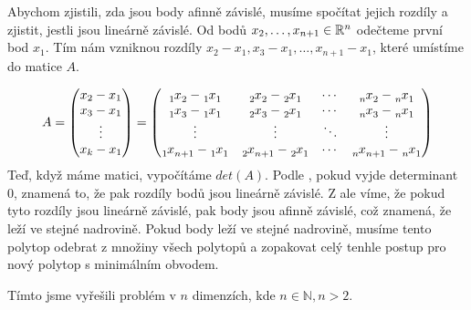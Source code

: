 Abychom zjistili, zda jsou body afinně závislé, musíme spočítat jejich rozdíly a zjistit, jestli jsou lineárně závislé. Od bodů $x_2, \ldots, x_{n+1} \in \mathbb{R}^n$ odečteme první bod $x_1$. Tím nám vzniknou rozdíly $x_2-x_1, x_3-x_1, \dots, x_{n+1}-x_1$, které umístíme do matice $A$. 


\begingroup
\renewcommand*{\arraystretch}{1.25}
\delimitershortfall=0pt
\begin{equation*}
  A =
  \begin{pmatrix}
    x_2-x_1 \\
    x_3-x_1 \\
    \vdots  \\
    x_k-x_1
  \end{pmatrix}
  =
  \begin{pmatrix}
    \x{1}{2} - \x{1}{1} & \x{2}{2} - \x{2}{1} & \cdots & \x{n}{2} - \x{n}{1} \\
    \x{1}{3} - \x{1}{1} & \x{2}{3} - \x{2}{1} & \cdots & \x{n}{3} - \x{n}{1} \\
    \vdots        & \vdots        & \ddots & \vdots        \\
    \x{1}{n_+_1} - \x{1}{1} & \x{2}{n_+_1} - \x{2}{1} & \cdots & \x{n}{n_+_1} - \x{n}{1} \\
  \end{pmatrix}
\end{equation*}
\endgroup
Teď, když máme matici, vypočítáme $det(A)$. Podle , pokud vyjde determinant $0$, znamená to, že pak rozdíly bodů jsou lineárně závislé. Z  ale víme, že pokud tyto rozdíly jsou lineárně závislé, pak body jsou afinně závislé, což znamená, že leží ve stejné nadrovině. Pokud body leží ve stejné nadrovině, musíme tento polytop odebrat z množiny všech polytopů a zopakovat celý tenhle postup pro nový polytop s minimálním obvodem. 

Tímto jsme vyřešili problém v $n$ dimenzích, kde $n \in \mathbb{N}, n > 2$.